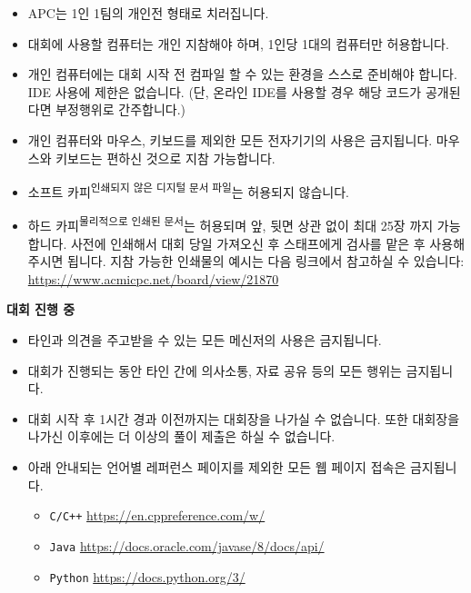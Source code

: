 \begin{spacing}{1.15}
\begin{itemize}
    \item APC는 1인 1팀의 개인전 형태로 치러집니다.
    \item 대회에 사용할 컴퓨터는 개인 지참해야 하며, 1인당 1대의 컴퓨터만 허용합니다.
    \item 개인 컴퓨터에는 대회 시작 전 컴파일 할 수 있는 환경을 스스로 준비해야 합니다. IDE 사용에 제한은 없습니다. (단, 온라인 IDE를 사용할 경우 해당 코드가 공개된다면 부정행위로 간주합니다.)
    \item 개인 컴퓨터와 마우스, 키보드를 제외한 모든 전자기기의 사용은 금지됩니다. 마우스와 키보드는 편하신 것으로 지참 가능합니다.
    \item 소프트 카피\textsuperscript{인쇄되지 않은 디지털 문서 파일}는 허용되지 않습니다.
    \item 하드 카피\textsuperscript{물리적으로 인쇄된 문서}는 허용되며 앞, 뒷면 상관 없이 최대 25장 까지 가능합니다. 사전에 인쇄해서 대회 당일 가져오신 후 스태프에게 검사를 맡은 후 사용해 주시면 됩니다.
지참 가능한 인쇄물의 예시는 다음 링크에서 참고하실 수 있습니다: \href{https://www.acmicpc.net/board/view/21870}{https://www.acmicpc.net/board/view/21870}
\end{itemize}

\textbf{대회 진행 중}

\begin{itemize}
    \item 타인과 의견을 주고받을 수 있는 모든 메신저의 사용은 금지됩니다.
    \item 대회가 진행되는 동안 타인 간에 의사소통, 자료 공유 등의 모든 행위는 금지됩니다.
    \item 대회 시작 후 1시간 경과 이전까지는 대회장을 나가실 수 없습니다. 또한 대회장을 나가신 이후에는 더 이상의 풀이 제출은 하실 수 없습니다.
    \item 아래 안내되는 언어별 레퍼런스 페이지를 제외한 모든 웹 페이지 접속은 금지됩니다. 
    \begin{itemize}
        \item \texttt{C/C++} \tabto{2cm} \href{https://en.cppreference.com/w/}{https://en.cppreference.com/w/}
        \item \texttt{Java} \tabto{2cm} \href{https://docs.oracle.com/javase/8/docs/api/}{https://docs.oracle.com/javase/8/docs/api/}
        \item \texttt{Python} \tabto{2cm} \href{https://docs.python.org/3/}{https://docs.python.org/3/}
    \end{itemize}
\end{itemize}


\end{spacing}
